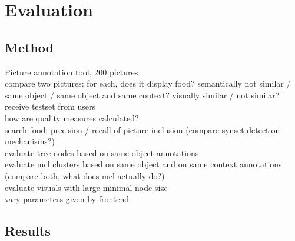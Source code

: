 %
\section{Evaluation}
\label{sec_literatur}

\subsection{Method}
Picture annotation tool, 200 pictures \\
compare two pictures: for each, does it display food? semantically not similar / same object / same object and same context? visually similar / not similar? \\

receive testset from users \\

how are quality measures calculated? \\

search food: precision  / recall of picture inclusion (compare synset detection mechanisms?) \\
evaluate tree nodes based on same object annotations \\
evaluate mcl clusters based on same object and on same context annotations (compare both, what does mcl actually do?) \\

evaluate visuals with large minimal node size \\

vary parameters given by frontend \\

\subsection{Results}

